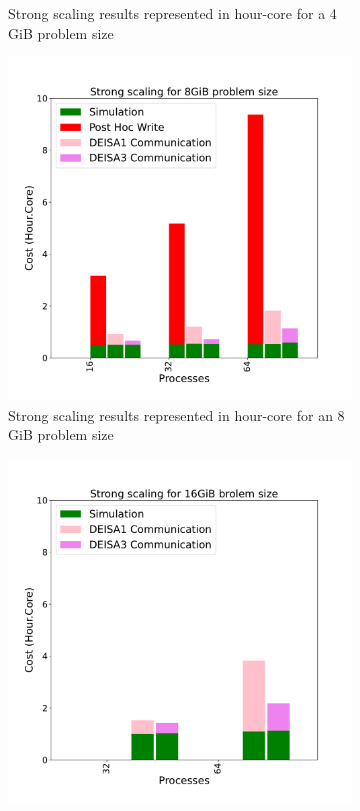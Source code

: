 \begin{figure}[hb]
\begin{subfigure}[b]{0.4\textwidth}
         \caption{Strong scaling results represented in hour-core for a 4\,GiB problem size}
         \label{fig:D4}
     \end{subfigure}
     \vfill
     \begin{subfigure}[b]{0.4\textwidth}
         \centering
         \includegraphics[width=\textwidth, height=\textwidth]{figures/D8_1vs3vspost1vspost2.pdf}
         \caption{Strong scaling results represented in hour-core for an 8\,GiB problem size}
         \label{fig:D8}
     \end{subfigure}
     \hfill
     \begin{subfigure}[b]{0.4\textwidth}
         \centering
         \includegraphics[width=\textwidth, height=\textwidth]{figures/D16_1vs3vspost1vspost2.pdf}

\end{subfigure}
\end{figure}
